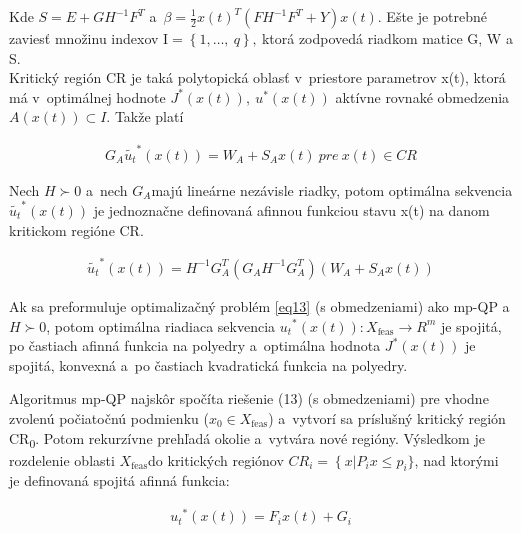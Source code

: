 Kde \(S = E + GH^{- 1}F^{T}\)
a~\(\beta = \frac{1}{2}{x\left( t \right)}^{T}\left( FH^{- 1}F^{T} + Y \right)x(t)\).
Ešte je potrebné zaviesť množinu indexov
I\(= \left\{ 1,\ldots,\ q \right\},\ \)ktorá zodpovedá riadkom matice G,
W a S. \\
Kritický región CR je taká polytopická oblasť v~priestore parametrov
x(t), ktorá má v~optimálnej hodnote
\(J^{*}\left( x\left( t \right) \right),\ u^{*}\left( x\left( t \right) \right)\)
aktívne rovnaké obmedzenia \(A(x(t)) \subset I\). Takže platí

\begin{equation} \label{eq34}
\begin{split}
G_{A}{\tilde{u_{t}}}^{*}\left( x\left( t \right) \right) = W_{A} + S_{A}x\left( t \right)\ pre\ x(t) \in CR
\end{split}
\end{equation}

Nech \(H \succ 0\) a~nech \(G_{A}\)majú lineárne nezávisle riadky, potom
optimálna sekvencia
\({\tilde{u_{t}}}^{*}\left( x\left( t \right) \right)\) je jednoznačne
definovaná afinnou funkciou stavu x(t) na danom kritickom regióne CR.

\begin{equation} \label{eq35}
\begin{split}
{\tilde{u_{t}}}^{*}\left( x\left( t \right) \right) = H^{- 1}G_{A}^{T}(G_{A}H^{- 1}G_{A}^{T})(W_{A} + S_{A}x\left( t \right))
\end{split}
\end{equation}

Ak sa preformuluje optimalizačný problém \ref{eq13} (s obmedzeniami) ako mp-QP
a \(H \succ 0\), potom optimálna riadiaca sekvencia
\({u_{t}}^{*}\left( x\left( t \right) \right):X_{\text{feas}} \rightarrow R^{m}\)
je spojitá, po častiach afinná funkcia na polyedry a~optimálna hodnota
\(J^{*}(x\left( t \right))\) je spojitá, konvexná a~po častiach
kvadratická funkcia na polyedry.

Algoritmus mp-QP najskôr spočíta riešenie (13) (s obmedzeniami) pre
vhodne zvolenú počiatočnú podmienku (\(x_{0} \in X_{\text{feas}}\))
a~vytvorí sa príslušný kritický región CR\textsubscript{0}. Potom
rekurzívne prehľadá okolie a~vytvára nové regióny. Výsledkom je
rozdelenie oblasti \(X_{\text{feas}}\)do kritických regiónov
\(CR_{i} = \left\{ x \right|P_{i}x \leq p_{i}\}\), nad ktorými je
definovaná spojitá afinná funkcia:

\begin{equation} \label{eq36}
\begin{split}
{u_{t}}^{*}\left( x\left( t \right) \right) = F_{i}x\left( t \right) + G_{i}
\end{split}
\end{equation}

